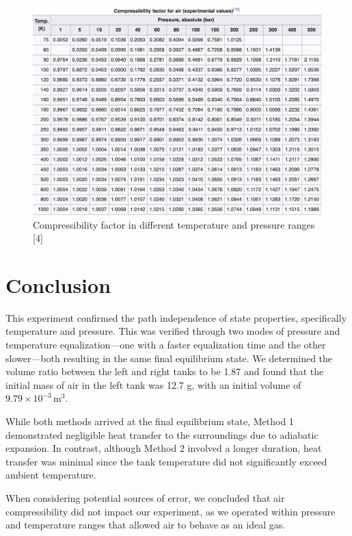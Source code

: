 \documentclass[titlepage, twocolumn, 12pt]{article}
\begin{document}
\begin{figure}[h]
    \centering
    \includegraphics[width=0.9\columnwidth]{images/air_compressability.png}  %
    \caption{Compressibility factor in different temperature and pressure ranges [4]}
    \label{fig:compressibility}
\end{figure}


\section{Conclusion}

This experiment confirmed the path independence of state properties, specifically temperature and pressure. This was verified through two modes of pressure and temperature equalization—one with a faster equalization time and the other slower—both resulting in the same final equilibrium state. We determined the volume ratio between the left and right tanks to be 1.87 and found that the initial mass of air in the left tank was 12.7 g, with an initial volume of \( 9.79 \times 10^{-3} \, \text{m}^3 \).

While both methods arrived at the final equilibrium state, Method 1 demonstrated negligible heat transfer to the surroundings due to adiabatic expansion. In contrast, although Method 2 involved a longer duration, heat transfer was minimal since the tank temperature did not significantly exceed ambient temperature.

When considering potential sources of error, we concluded that air compressibility did not impact our experiment, as we operated within pressure and temperature ranges that allowed air to behave as an ideal gas.
\end{document}
